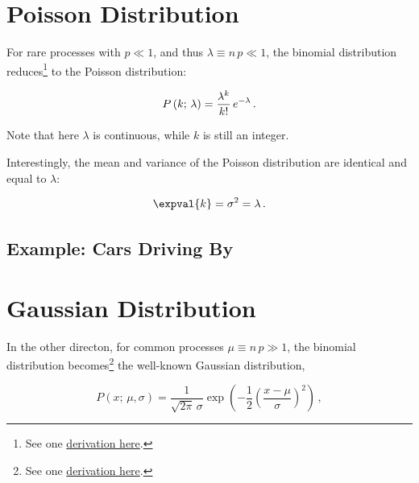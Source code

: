 \section{Poisson Distribution}
\label{stats:poisson}

For rare processes with $p \ll 1$, and thus $\lambda \equiv n\,p \ll 1$,
the binomial distribution reduces\footnote{See
one \href{https://medium.com/@andrew.chamberlain/deriving-the-poisson-distribution-from-the-binomial-distribution-840cc1668239}{derivation here}.} to the
Poisson distribution:

\begin{equation}\label{eq:stats:poisson:P}
P\left(k;\,\lambda\right) = \frac{\lambda^{k}}{k!}\,e^{-\lambda}\,. \\
\end{equation}

\noindent Note that here $\lambda$ is continuous, while $k$ is still an integer.

Interestingly, the mean and variance of the Poisson distribution are identical and equal to $\lambda$:

\begin{equation}\label{eq:stats:poisson:mean_variance}
\expval{k} = \sigma^{2} = \lambda\,.
\end{equation}

\subsection{Example: Cars Driving By}
\label{stats:poisson:cars}

\section{Gaussian Distribution}
\label{stats:gaus}

In the other directon, for common processes $\mu \equiv n\,p \gg 1$,
the binomial distribution becomes\footnote{See
one \href{http://scipp.ucsc.edu/~haber/ph116C/NormalApprox.pdf}{derivation here}.} the
well-known  Gaussian distribution,

\begin{equation}\label{eq:stats:gauss:P}
P\left(x;\,\mu,\sigma\right) = \frac{1}{\sqrt{2\pi}\,\sigma} \exp\left( -\frac{1}{2} \left(\frac{x-\mu}{\sigma}\right)^{2} \right)\,,
\end{equation}

